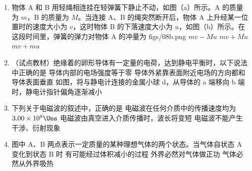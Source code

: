 \documentclass[\gkver]{gaokaozhenti}
\begin{document}
\begin{enumerate}
\item
物体 A 和 B 用轻绳相连挂在轻弹簧下静止不动，如图（a）所示。A 的质量为 $m$，B 的质量为 $M$。当连接 A、B 的绳突然断开后，物体 A 上升经某一位置时的速度大小为 $v$，这时物体 B 的下落速度大小为 $u$，如图（b）所示。在这段时间里，弹簧的弹力对物体 A 的冲量为
{figs/08b.png}
{$mv - Mu$}
{$mv + Mu$}
{$mv + mu$}

\item
（试点教材）绝缘着的卵形导体有一定量的电荷，达到静电平衡时，以下说法中正确的是
\onepicture[w=4.97cm]{}
{导体内部的电场强度等于零}
{导体外紧靠表面附近电场的方向都和导体表面垂直}
{如图，将与静电计连接的金属小球 d，从导体的 a 端移向 b 端时，静电计指针偏角逐渐减小}

\item
下列关于电磁波的叙述中，正确的是
{电磁波在任何介质中的传播速度均为 $3.00\times10^{8}\Ums$}
{电磁波由真空进入介质传播时，波长将变短}
{电磁波不能产生干涉、衍射现象}

\item
图中 A、B 两点表示一定质量的某种理想气体的两个状态。当气体自状态 A 变化到状态 B 时
\onepicture[w=3.59cm]{}
{有可能经过体积减小的过程}
{外界必然对气体做正功}
{气体必然从外界吸热}


\end{enumerate}
\end{document}
